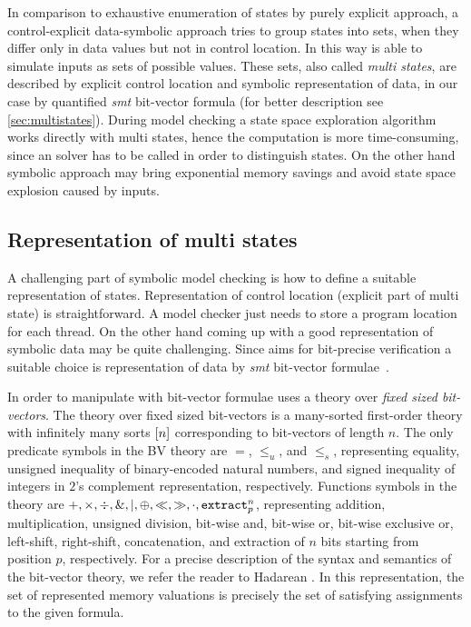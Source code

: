 In comparison to exhaustive enumeration of states by purely explicit approach, a
control-explicit data-symbolic approach tries to group states into sets, when
they differ only in data values but not in control location. In this way \SymDIVINE is able to
simulate inputs as sets of possible values. These sets, also called \emph{multi states}, are described by explicit control location and symbolic representation of
data, in our case by quantified \emph{smt} bit-vector formula (for better description see
\autoref{sec:multistates}). During model checking a state space exploration
algorithm works directly with multi states, hence the computation is more
time-consuming, since an \SMT solver has to be called in order to
distinguish states. On the other hand symbolic approach may bring
exponential memory savings and avoid state space explosion caused by inputs.

\subsection{Representation of multi states} \label{sec:multistates}

A challenging part of symbolic model checking is how to define a suitable
representation of states. Representation of control location (explicit part of
multi state) is straightforward. A model checker just needs to store
a program location for each thread. On the other hand coming up with a good
representation of symbolic data may be quite challenging. Since \DIVINE aims
for bit-precise verification a suitable choice is representation of data
by \emph{smt} bit-vector formulae~\cite{Bauch14}.

In order to manipulate with bit-vector formulae \SymDIVINE uses a theory over
\emph{fixed sized bit-vectors}. The theory over fixed sized bit-vectors is a many-sorted
first-order theory with infinitely many sorts $[n]$ corresponding
to bit-vectors of length $n$. The only predicate symbols in the BV theory
are $=$, $\leq_u$, and $\leq_s$, representing
equality, unsigned inequality of binary-encoded natural numbers, and
signed inequality of integers in $2$'s complement representation,
respectively. Functions symbols in the theory are
$+, \times, \div, \&, \mid, \oplus, \ll, \gg, \cdot, \texttt{extract}^{n}_{p}$,
representing addition, multiplication, unsigned division, bit-wise
and, bit-wise or, bit-wise exclusive or, left-shift, right-shift,
concatenation, and extraction of $n$ bits starting from position $p$,
respectively. For a precise description of the syntax and semantics of the bit-vector
theory, we refer the reader to Hadarean \cite{Hadarean14}. In this representation,
the set of represented memory valuations is precisely the set of satisfying assignments
to the given formula.

